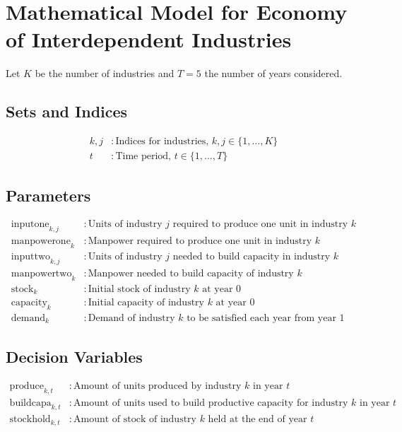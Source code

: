 \documentclass{article}
\begin{document}
\section*{Mathematical Model for Economy of Interdependent Industries}

Let \( K \) be the number of industries and \( T = 5 \) the number of years considered.

\subsection*{Sets and Indices}
\begin{align*}
k, j & : \text{Indices for industries, } k, j \in \{1, \ldots, K\} \\
t & : \text{Time period, } t \in \{1, \ldots, T\}
\end{align*}

\subsection*{Parameters}
\begin{align*}
\text{inputone}_{k,j} & : \text{Units of industry } j \text{ required to produce one unit in industry } k \\
\text{manpowerone}_k & : \text{Manpower required to produce one unit in industry } k \\
\text{inputtwo}_{k,j} & : \text{Units of industry } j \text{ needed to build capacity in industry } k \\
\text{manpowertwo}_k & : \text{Manpower needed to build capacity of industry } k \\
\text{stock}_k & : \text{Initial stock of industry } k \text{ at year 0} \\
\text{capacity}_k & : \text{Initial capacity of industry } k \text{ at year 0} \\
\text{demand}_k & : \text{Demand of industry } k \text{ to be satisfied each year from year 1}
\end{align*}

\subsection*{Decision Variables}
\begin{align*}
\text{produce}_{k,t} & : \text{Amount of units produced by industry } k \text{ in year } t \\
\text{buildcapa}_{k,t} & : \text{Amount of units used to build productive capacity for industry } k \text{ in year } t \\
\text{stockhold}_{k,t} & : \text{Amount of stock of industry } k \text{ held at the end of year } t
\end{align*}
\end{document}
